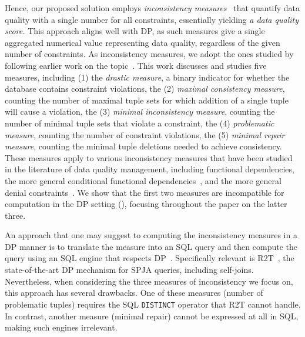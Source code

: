 Hence, our proposed solution employs \emph{inconsistency measures}~\cite{thimm2017compliance, parisi2019inconsistency, LivshitsKTIKR21,DBLP:conf/sum/Bertossi18,DBLP:conf/ecsqaru/GrantH13,DBLP:journals/ijar/GrantH23,LivshitsK22,LivshitsBKS20} 
that quantify data quality with a single number for all constraints, essentially yielding {\em a data quality score.} This approach aligns well with DP, as such measures give a single aggregated numerical value representing data quality, regardless of the given number of constraints. 
As inconsistency measures, we adopt the ones studied by \citet{LivshitsKTIKR21} following earlier work on the topic~\cite{thimm2017compliance, parisi2019inconsistency, 
DBLP:conf/sum/Bertossi18,DBLP:conf/ecsqaru/GrantH13}. 
This work discusses and studies five measures, including (1) the {\em drastic measure}, a binary indicator for whether the database contains constraint violations, the (2) \emph{maximal consistency measure}, counting the number of maximal tuple sets for which addition of a single tuple will cause a violation, the (3) {\em minimal inconsistency measure}, counting the number of minimal tuple sets that violate a constraint, 
the (4) \emph{problematic measure}, counting the number of constraint violations, the (5) \emph{minimal repair measure}, counting the minimal tuple deletions needed to achieve consistency. 
These measures apply to various inconsistency measures that have been studied in the literature of data quality management, including functional dependencies, the more general conditional functional dependencies~\cite{bohannon2007conditional}, and the more general denial constraints~\cite{ChomickiM05}.
We show that the first two measures are incompatible for computation in the DP setting (), focusing throughout the paper on the latter three. 

An approach that one may suggest to computing the inconsistency measures in a DP manner is to translate the measure into an SQL query and then compute the query using an SQL engine that respects DP~\cite{tao2020computing,dong2022r2t,kotsogiannis2019privatesql,johnson2018towards}. Specifically relevant is R2T~\cite{dong2022r2t}, the state-of-the-art DP mechanism for SPJA queries, including self-joins. Nevertheless, when considering the three measures of inconsistency we focus on, this approach has several drawbacks. One of these measures (number of problematic tuples) requires the SQL {\tt DISTINCT} operator that R2T cannot handle. In contrast, another measure (minimal repair) cannot be expressed at all in SQL, making such engines irrelevant. 

